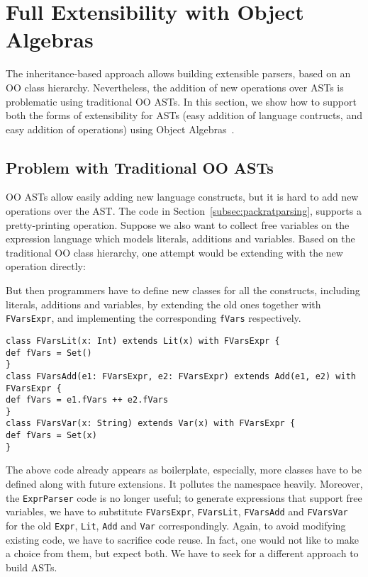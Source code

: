 \section{Full Extensibility with Object Algebras}\label{sec:algebrasandparsing}

The inheritance-based approach allows building extensible parsers, based on an OO class hierarchy.  Nevertheless, the addition of new operations over ASTs is problematic using traditional OO ASTs. In this section, we
show how to support both the forms of extensibility for ASTs (easy
addition of language contructs, and easy addition of operations)
using Object Algebras~\cite{}.

\subsection{Problem with Traditional OO ASTs}\label{subsec:problemwithoutoa}

OO ASTs allow easily adding new language constructs, but it is hard
to add new operations over the AST. The code in Section~\ref{subsec:packratparsing},
supports a pretty-printing operation. Suppose we also want to collect free variables on the expression language which models
literals, additions and variables. Based on the traditional OO class hierarchy, one attempt would be extending  with the new
operation directly:


But then programmers have to define new classes for all the constructs, including literals, additions and variables, by extending the old ones together with \lstinline{FVarsExpr}, and implementing the corresponding \lstinline{fVars} respectively.

\begin{lstlisting}
class FVarsLit(x: Int) extends Lit(x) with FVarsExpr {
def fVars = Set()
}
class FVarsAdd(e1: FVarsExpr, e2: FVarsExpr) extends Add(e1, e2) with FVarsExpr {
def fVars = e1.fVars ++ e2.fVars
}
class FVarsVar(x: String) extends Var(x) with FVarsExpr {
def fVars = Set(x)
}
\end{lstlisting}
The above code already appears as boilerplate, especially, more classes have to be defined along with future extensions. It pollutes the namespace heavily. Moreover, the \lstinline{ExprParser} code is no longer useful; to generate expressions that support free variables, we have to substitute \lstinline{FVarsExpr}, \lstinline{FVarsLit}, \lstinline{FVarsAdd} and \lstinline{FVarsVar} for the old \lstinline{Expr}, \lstinline{Lit}, \lstinline{Add} and \lstinline{Var} correspondingly. Again, to avoid modifying existing code, we have to sacrifice code reuse. In fact, one would not like to make a choice from them, but expect both. We have to seek for a different approach to build ASTs. 


